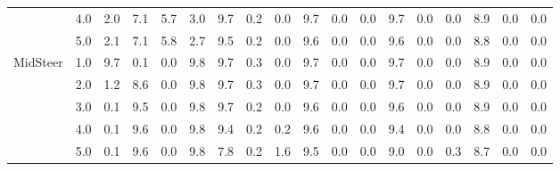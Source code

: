 \begin{table}[th!]
{\begin{tabular}{lc|cc|cc|ccc|ccc|ccc|ccc}
 & 4.0 & 2.0 & 7.1 & 5.7 & 3.0 & 9.7 & 0.2 & 0.0 & 9.7 & 0.0 & 0.0 & 9.7 & 0.0 & 0.0 & 8.9 & 0.0 & 0.0 \\
 & 5.0 & 2.1 & 7.1 & 5.8 & 2.7 & 9.5 & 0.2 & 0.0 & 9.6 & 0.0 & 0.0 & 9.6 & 0.0 & 0.0 & 8.8 & 0.0 & 0.0 \\
\cline{1-18}
\multirow{5}{*}{MidSteer} & 1.0 & 9.7 & 0.1 & 0.0 & 9.8 & 9.7 & 0.3 & 0.0 & 9.7 & 0.0 & 0.0 & 9.7 & 0.0 & 0.0 & 8.9 & 0.0 & 0.0 \\
 & 2.0 & 1.2 & 8.6 & 0.0 & 9.8 & 9.7 & 0.3 & 0.0 & 9.7 & 0.0 & 0.0 & 9.7 & 0.0 & 0.0 & 8.9 & 0.0 & 0.0 \\
 & 3.0 & 0.1 & 9.5 & 0.0 & 9.8 & 9.7 & 0.2 & 0.0 & 9.6 & 0.0 & 0.0 & 9.6 & 0.0 & 0.0 & 8.9 & 0.0 & 0.0 \\
 & 4.0 & 0.1 & 9.6 & 0.0 & 9.8 & 9.4 & 0.2 & 0.2 & 9.6 & 0.0 & 0.0 & 9.4 & 0.0 & 0.0 & 8.8 & 0.0 & 0.0 \\
 & 5.0 & 0.1 & 9.6 & 0.0 & 9.8 & 7.8 & 0.2 & 1.6 & 9.5 & 0.0 & 0.0 & 9.0 & 0.0 & 0.3 & 8.7 & 0.0 & 0.0 \\
\bottomrule
\end{tabular}}
\end{table}


